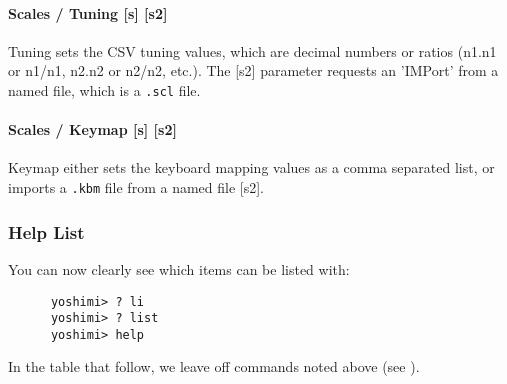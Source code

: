 \paragraph{Scales / Tuning [s] [s2]}
\label{paragraph:command_line_tuning}

   Tuning sets the CSV tuning values, which are decimal numbers or ratios
   (n1.n1 or n1/n1, n2.n2 or n2/n2, etc.).
   The [s2] parameter requests an 'IMPort' from a named file, which is
   a \texttt{.scl} file.

\paragraph{Scales / Keymap [s] [s2]}
\label{paragraph:command_line_keymap}

   Keymap either sets the keyboard mapping values as a comma separated list, or
   imports a
   \texttt{.kbm} file from a named file [s2].

\subsubsection{Help List}
\label{subsec:command_line_help_list}

   You can now clearly see which items can be listed with:

   \begin{verbatim}
      yoshimi> ? li
      yoshimi> ? list
      yoshimi> help
   \end{verbatim}

   In the table that follow, we leave off commands noted above
   (see ).

